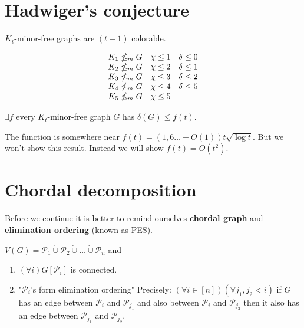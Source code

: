 \section{Hadwiger's conjecture}

$K_{t}$-minor-free graphs are $(t-1)$ colorable.

$$
\begin{array}{c c c}
	K_{1} \nleq_{m} G & \chi \leq 1 & \delta \leq 0 \\
	K_{2} \nleq_{m} G & \chi \leq 2 & \delta \leq 1 \\
	K_{3} \nleq_{m} G & \chi \leq 3 & \delta \leq 2 \\
	K_{4} \nleq_{m} G & \chi \leq 4 & \delta \leq 5 \\
	K_{5} \nleq_{m} G & \chi \leq 5 & \\
\end{array}
$$

\begin{thm}
	$\exists f$ every $K_{t}$-minor-free graph $G$ has $\delta(G) \leq f(t)$.
\end{thm}

The function is somewhere near $f(t) = (1,6\dots + O(1)) t \sqrt{\log t}$. But we won't show this result. Instead we will show $f(t) = O(t^{2})$.

\section{Chordal decomposition}

Before we continue it is better to remind ourselves \textbf{chordal graph} and \textbf{elimination ordering} (known as PES).

\begin{defn}
	$V(G) = \mathcal{P}_{1} \dot{\cup} \mathcal{P}_{2} \dot{\cup} \dots \dot{\cup} \mathcal{P}_{n}$ and
	
	\begin{enumerate}
		\item $(\forall i) G[\mathcal{P}_{i}]$ is connected.
		\item "$\mathcal{P}_{i}$'s form elimination ordering" Precisely: $(\forall i \in [n])(\forall j_{1},j_{2} < i)$ if $G$ has an edge between $\mathcal{P}_{i}$ and $\mathcal{P}_{j_{1}}$ and also between $\mathcal{P}_{i}$ and $\mathcal{P}_{j_{2}}$ then it also has an edge between $\mathcal{P}_{j_{1}}$ and $\mathcal{P}_{j_{2}}$.
	\end{enumerate}
\end{defn}


